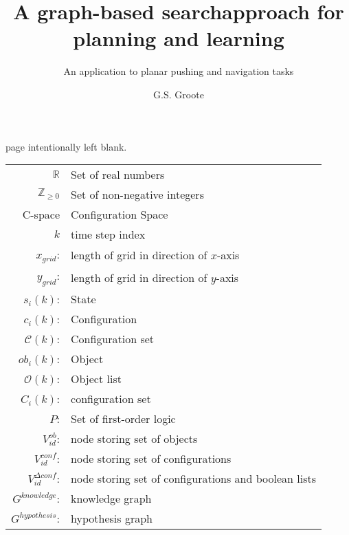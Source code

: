 \documentclass{layout/tudelft-report}
\begin{document}
\frontmatter

\title{A graph-based search\newline approach for planning and learning}

\subtitle{An application to planar pushing and navigation tasks} 

\author{G.S. Groote}
\subject{SC52045: System \& Control Thesis Report}

%
\makecover
page intentionally left blank.
\newpage



\tableofcontents
\listoffigures
\listoftables
\newpage
\begin{table}[H]
    \centering
    \begin{tabular}{r l}
      $\mathbb{R}$ & \textrm{Set of real numbers}\\
      $\mathbb{Z}_{\geq 0}$ & \textrm{Set of non-negative integers}\\
      C-space & Configuration Space\\ 
      $k$ & \textrm{time step index}\\
      $x_{\mathit{grid}}$: & length of grid in direction of $x$-axis\\  
      $y_{\mathit{grid}}$: & length of grid in direction of $y$-axis\\  
      $s_i(k)$: & \textrm{State}\\
      $c_i(k)$: & \textrm{Configuration}\\
      $\mathcal{C}(k)$: & \textrm{Configuration set} \\
      $ob_i(k)$: & \textrm{Object}\\
      $\mathcal{O}(k)$: & \textrm{Object list}\\
      $C_i(k)$: & \textrm{configuration set}\\
      $P$: & \textrm{Set of first-order logic}\\
      $V^{ob}_{id}$: & \textrm{node storing set of objects}\\
      $V^{conf}_{id}$: & \textrm{node storing set of configurations}\\
      $V^{\Delta conf}_{id}$: & \textrm{node storing set of configurations and boolean lists}\\
      $G^{knowledge}$: & \textrm{knowledge graph}\\
      $G^{hypothesis}$: & \textrm{hypothesis graph}\\

\end{tabular}
\end{table}
\end{document}
